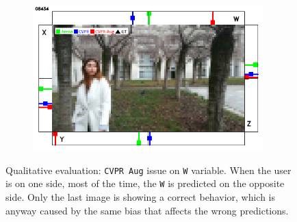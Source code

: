 \begin{figure}[H]
\begin{center}
\begin{subfigure}[h]{0.49\textwidth}
		\end{subfigure}
		\hfill
		\begin{subfigure}[h]{0.49\textwidth}
			\centering
			\includegraphics[width=0.98\textwidth]{"contents/images/qualitative-videos/W-bias-square01-8434"}
		\end{subfigure}
	\end{center}
	\vspace{-0.5cm}
	\caption[Qualitative evaluation: \texttt{CVPR Aug} issue on \texttt{W} variable]{Qualitative evaluation: \texttt{CVPR Aug} issue on \texttt{W} variable. When the user is on one side, most of the time, the \texttt{W} is predicted on the opposite side. Only the last image is showing a correct behavior, which is anyway caused by the same bias that affects the wrong predictions.}
	\label{fig:ql-sim-w-bias}
\end{figure}